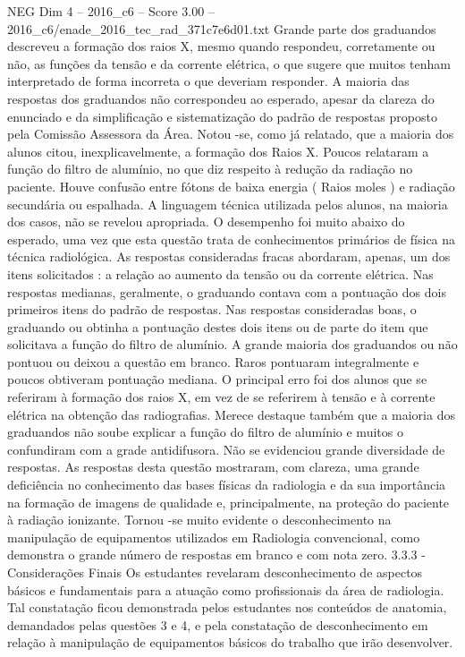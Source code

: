 \begin{textsample}{NEG Dim 4 – 2016\_c6 – Score 3.00 – 2016\_c6/enade\_2016\_tec\_rad\_371c7e6d01.txt}
Grande parte dos graduandos descreveu a formação dos raios X, mesmo quando respondeu, corretamente ou não, as funções da tensão e da corrente elétrica, o que sugere que muitos tenham interpretado de forma incorreta o que deveriam responder.
A maioria das respostas dos graduandos não correspondeu ao esperado, apesar da clareza do enunciado e da simplificação e sistematização do padrão de respostas proposto pela Comissão Assessora da Área.
Notou -se, como já relatado, que a maioria dos alunos citou, inexplicavelmente, a formação dos Raios X.
Poucos relataram a função do filtro de alumínio, no que diz respeito à redução da radiação no paciente.
Houve confusão entre fótons de baixa energia ( Raios moles ) e radiação secundária ou espalhada.
A linguagem técnica utilizada pelos alunos, na maioria dos casos, não se revelou apropriada.
O desempenho foi muito abaixo do esperado, uma vez que esta questão trata de conhecimentos primários de física na técnica radiológica.
As respostas consideradas fracas abordaram, apenas, um dos itens solicitados : a relação ao aumento da tensão ou da corrente elétrica.
Nas respostas medianas, geralmente, o graduando contava com a pontuação dos dois primeiros itens do padrão de respostas.
Nas respostas consideradas boas, o graduando ou obtinha a pontuação destes dois itens ou de parte do item que solicitava a função do filtro de alumínio.
A grande maioria dos graduandos ou não pontuou ou deixou a questão em branco.
Raros pontuaram integralmente e poucos obtiveram pontuação mediana.
O principal erro foi dos alunos que se referiram à formação dos raios X, em vez de se referirem à tensão e à corrente elétrica na obtenção das radiografias.
Merece destaque também que a maioria dos graduandos não soube explicar a função do filtro de alumínio e muitos o confundiram com a grade antidifusora.
Não se evidenciou grande diversidade de respostas.
As respostas desta questão mostraram, com clareza, uma grande deficiência no conhecimento das bases físicas da radiologia e da sua importância na formação de imagens de qualidade e, principalmente, na proteção do paciente à radiação ionizante.
Tornou -se muito evidente o desconhecimento na manipulação de equipamentos utilizados em Radiologia convencional, como demonstra o grande número de respostas em branco e com nota zero. 3.3.3 - Considerações Finais Os estudantes revelaram desconhecimento de aspectos básicos e fundamentais para a atuação como profissionais da área de radiologia.
Tal constatação ficou demonstrada pelos estudantes nos conteúdos de anatomia, demandados pelas questões 3 e 4, e pela constatação de desconhecimento em relação à manipulação de equipamentos básicos do trabalho que irão desenvolver.

\end{textsample}

